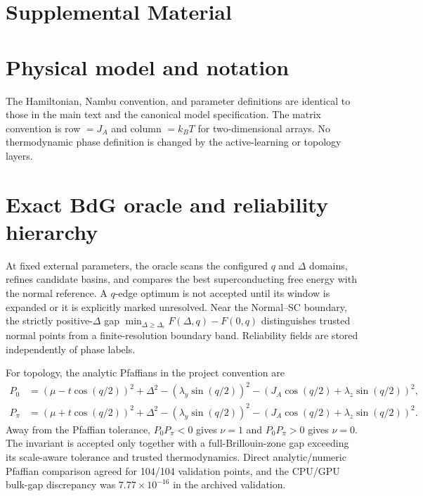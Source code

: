 \section*{Supplemental Material}
\setcounter{section}{0}

\section{Physical model and notation}
The Hamiltonian, Nambu convention, and parameter definitions are identical to
those in the main text and the canonical model specification.  The matrix
convention is row $=J_A$ and column $=k_BT$ for two-dimensional arrays.  No
thermodynamic phase definition is changed by the active-learning or topology
layers.

\section{Exact BdG oracle and reliability hierarchy}
At fixed external parameters, the oracle scans the configured $q$ and
$\Delta$ domains, refines candidate basins, and compares the best
superconducting free energy with the normal reference.  A $q$-edge optimum is
not accepted until its window is expanded or it is explicitly marked
unresolved.  Near the Normal--SC boundary, the strictly positive-$\Delta$ gap
$\min_{\Delta\geq\Delta_\epsilon}F(\Delta,q)-F(0,q)$ distinguishes trusted
normal points from a finite-resolution boundary band.  Reliability fields are
stored independently of phase labels.

For topology, the analytic Pfaffians in the project convention are
\begin{align}
P_0&=(\mu-t\cos(q/2))^2+\Delta^2
-(\lambda_y\sin(q/2))^2-(J_A\cos(q/2)+\lambda_z\sin(q/2))^2,\\
P_\pi&=(\mu+t\cos(q/2))^2+\Delta^2
-(\lambda_y\sin(q/2))^2-(J_A\cos(q/2)+\lambda_z\sin(q/2))^2.
\end{align}
Away from the Pfaffian tolerance, $P_0P_\pi<0$ gives $\nu=1$ and
$P_0P_\pi>0$ gives $\nu=0$.  The invariant is accepted only together with a
full-Brillouin-zone gap exceeding its scale-aware tolerance and trusted
thermodynamics.  Direct analytic/numeric Pfaffian comparison agreed for
104/104 validation points, and the CPU/GPU bulk-gap discrepancy was
$7.77\times10^{-16}$ in the archived validation.

